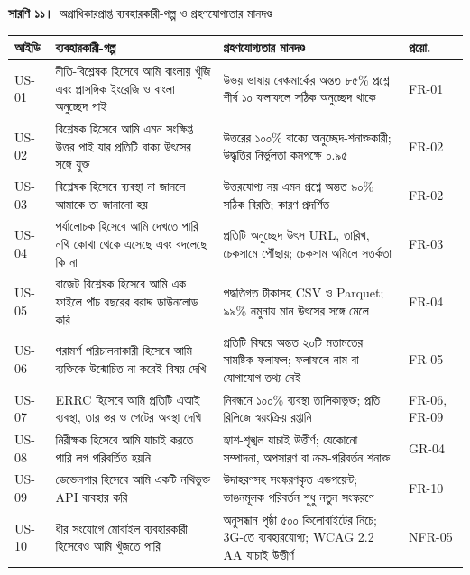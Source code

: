 \documentclass[border=10pt]{standalone}
\begin{document}
\begin{minipage}{17cm}
{\large\bfseries সারণি ১১।}\ {\large অগ্রাধিকারপ্রাপ্ত ব্যবহারকারী-গল্প ও গ্রহণযোগ্যতার মানদণ্ড}\par\vspace{7pt}
\small
{}
\begin{tabularx}{\linewidth}{@{}>{\hsize=0.333\hsize\raggedright\arraybackslash}X>{\hsize=1.619\hsize\raggedright\arraybackslash}X>{\hsize=1.619\hsize\raggedright\arraybackslash}X>{\hsize=0.429\hsize\raggedright\arraybackslash}X@{}}
\arrayrulecolor{bapilrule}\toprule
\rowcolor{white}\textbf{আইডি} & \textbf{ব্যবহারকারী-গল্প} & \textbf{গ্রহণযোগ্যতার মানদণ্ড} & \textbf{প্রয়ো.} \\
\midrule
US-01 & নীতি-বিশ্লেষক হিসেবে আমি বাংলায় খুঁজি এবং প্রাসঙ্গিক ইংরেজি ও বাংলা অনুচ্ছেদ পাই & উভয় ভাষায় বেঞ্চমার্কের অন্তত ৮৫\% প্রশ্নে শীর্ষ ১০ ফলাফলে সঠিক অনুচ্ছেদ থাকে & FR-01 \\
US-02 & বিশ্লেষক হিসেবে আমি এমন সংক্ষিপ্ত উত্তর পাই যার প্রতিটি বাক্য উৎসের সঙ্গে যুক্ত & উত্তরের ১০০\% বাক্যে অনুচ্ছেদ-শনাক্তকারী; উদ্ধৃতির নির্ভুলতা কমপক্ষে ০.৯৫ & FR-02 \\
US-03 & বিশ্লেষক হিসেবে ব্যবস্থা না জানলে আমাকে তা জানানো হয় & উত্তরযোগ্য নয় এমন প্রশ্নে অন্তত ৯০\% সঠিক বিরতি; কারণ প্রদর্শিত & FR-02 \\
US-04 & পর্যালোচক হিসেবে আমি দেখতে পারি নথি কোথা থেকে এসেছে এবং বদলেছে কি না & প্রতিটি অনুচ্ছেদ উৎস URL, তারিখ, চেকসামে পৌঁছায়; চেকসাম অমিলে সতর্কতা & FR-03 \\
US-05 & বাজেট বিশ্লেষক হিসেবে আমি এক ফাইলে পাঁচ বছরের বরাদ্দ ডাউনলোড করি & পদ্ধতিগত টীকাসহ CSV ও Parquet; ৯৯\% নমুনায় মান উৎসের সঙ্গে মেলে & FR-04 \\
US-06 & পরামর্শ পরিচালনাকারী হিসেবে আমি ব্যক্তিকে উন্মোচিত না করেই বিষয় দেখি & প্রতিটি বিষয়ে অন্তত ২০টি মতামতের সামষ্টিক ফলাফল; ফলাফলে নাম বা যোগাযোগ-তথ্য নেই & FR-05 \\
US-07 & ERRC হিসেবে আমি প্রতিটি এআই ব্যবস্থা, তার স্তর ও গেটের অবস্থা দেখি & নিবন্ধনে ১০০\% ব্যবস্থা তালিকাভুক্ত; প্রতি রিলিজে স্বয়ংক্রিয় রপ্তানি & FR-06, FR-09 \\
US-08 & নিরীক্ষক হিসেবে আমি যাচাই করতে পারি লগ পরিবর্তিত হয়নি & হ্যাশ-শৃঙ্খল যাচাই উত্তীর্ণ; যেকোনো সম্পাদনা, অপসারণ বা ক্রম-পরিবর্তন শনাক্ত & GR-04 \\
US-09 & ডেভেলপার হিসেবে আমি একটি নথিভুক্ত API ব্যবহার করি & উদাহরণসহ সংস্করণকৃত এন্ডপয়েন্ট; ভাঙনমূলক পরিবর্তন শুধু নতুন সংস্করণে & FR-10 \\
US-10 & ধীর সংযোগে মোবাইল ব্যবহারকারী হিসেবেও আমি খুঁজতে পারি & অনুসন্ধান পৃষ্ঠা ৫০০ কিলোবাইটের নিচে; 3G-তে ব্যবহারযোগ্য; WCAG 2.2 AA যাচাই উত্তীর্ণ & NFR-05 \\
\bottomrule
\end{tabularx}
\par{}
\end{minipage}
\end{document}
